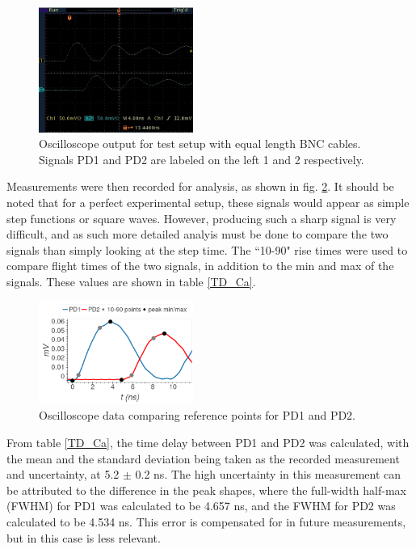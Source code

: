\documentclass[aps,prl,reprint]{revtex4-2}
\begin{document}
\begin{figure}[h]
\includegraphics[width=0.45\textwidth]{./BMPs/l4_C_b.jpg}
\caption{\label{setup} Oscilloscope output for test setup with equal length BNC cables.
Signals PD1 and PD2 are labeled on the left 1 and 2 respectively.}
\end{figure}

Measurements were then recorded for analysis, as shown in fig. \ref{same}. It should be
noted that for a perfect experimental setup, these signals would appear as simple step
functions or square waves. However, producing such a sharp signal is very difficult,
and as such more detailed analyis must be done to compare the two signals than simply 
looking at the step time. The ``10-90" rise times were used to compare flight times of 
the two signals, in addition to the min and max of the signals. These values are shown
in table \ref{TD_Ca}. \\

\begin{figure}[h]
\includegraphics[width=0.45\textwidth]{../Images/l4_C_b.png}
\caption{\label{same} Oscilloscope data comparing reference points for PD1 and PD2.}
\end{figure}

From table \ref{TD_Ca}, the time delay between PD1 and PD2 was calculated, with the
mean and the standard deviation being taken as the recorded measurement and 
uncertainty, at 5.2 $\pm$ 0.2 ns. The high uncertainty in this measurement can
be attributed to the difference in the peak shapes, where the full-width half-max (FWHM)
for PD1 was calculated to be 4.657 ns, and the FWHM for PD2 was calculated to be 4.534 ns.
This error is compensated for in future measurements, but in this case is less relevant. \\
\end{document}
